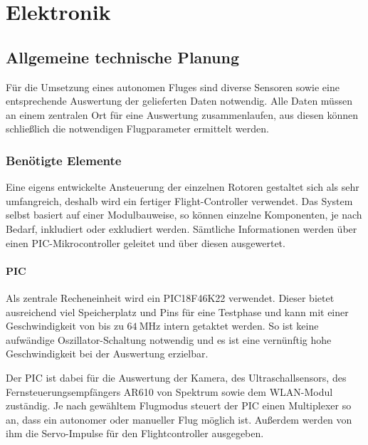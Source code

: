 \chapter{Elektronik}
\renewcommand{\kapitelautor}{Autor: Lucas Ullrich}

\section{Allgemeine technische Planung}
Für die Umsetzung eines autonomen Fluges sind diverse Sensoren sowie eine entsprechende Auswertung der gelieferten Daten notwendig.
Alle Daten müssen an einem zentralen Ort für eine Auswertung zusammenlaufen, aus diesen können schließlich die notwendigen Flugparameter ermittelt werden.

  \subsection{Benötigte Elemente}
  Eine eigens entwickelte Ansteuerung der einzelnen Rotoren gestaltet sich als sehr umfangreich, deshalb wird ein fertiger Flight-Controller verwendet.
  Das System selbst basiert auf einer Modulbauweise, so können einzelne Komponenten, je nach Bedarf, inkludiert oder exkludiert werden.
  Sämtliche Informationen werden über einen PIC-Mikrocontroller geleitet und über diesen ausgewertet.

    \subsubsection{PIC}
    Als zentrale Recheneinheit wird ein PIC18F46K22 verwendet. Dieser bietet ausreichend viel Speicherplatz und Pins für eine Testphase und kann mit einer Geschwindigkeit
    von bis zu $\SI{64}{\mega\hertz}$ intern getaktet werden. So ist keine aufwändige Oszillator-Schaltung notwendig und es ist eine vernünftig hohe Geschwindigkeit bei der
    Auswertung erzielbar.

    Der PIC ist dabei für die Auswertung der Kamera, des Ultraschallsensors, des Fernsteuerungsempfängers AR610 von Spektrum sowie dem WLAN-Modul zuständig.
    Je nach gewähltem Flugmodus steuert der PIC einen Multiplexer so an, dass ein autonomer oder manueller Flug möglich ist.
    Außerdem werden von ihm die Servo-Impulse für den Flightcontroller ausgegeben.

